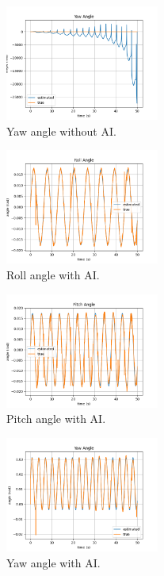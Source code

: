 \documentclass[conference]{IEEEtran}
\begin{document}
    \begin{figure}[H]
        \centerline{\includegraphics[width=0.45\textwidth]{../Figures/part_1_yaw_no_AI.png}}
        \caption{Yaw angle without AI.}
    \end{figure}
    \begin{figure}[H]
        \centerline{\includegraphics[width=0.45\textwidth]{../Figures/part_1_roll_AI.png}}
        \caption{Roll angle with AI.}
    \end{figure}
    \begin{figure}[H]
        \centerline{\includegraphics[width=0.45\textwidth]{../Figures/part_1_pitch_AI.png}}
        \caption{Pitch angle with AI.}
    \end{figure}
    \begin{figure}[H]
        \centerline{\includegraphics[width=0.45\textwidth]{../Figures/part_1_yaw_AI.png}}
        \caption{Yaw angle with AI.}
    \end{figure}
\end{document}
